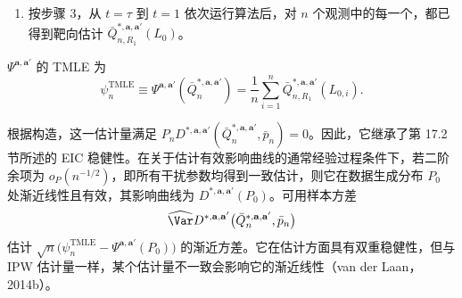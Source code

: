 \begin{enumerate}[label=\arabic*.]
\begin{enumerate}[label=(\alph*),leftmargin=2.4em]
\[  \]
  对 $\mathbf A_t,\mathbf R_t,\mathbf Z_{t-1},\mathbf L_{t-1}$ 回归。然后，对这些未删失观测，在其观测到的中介与协变量历史 $\mathbf R_t,\mathbf Z_{t-1},\mathbf L_{t-1}$，以及干预后的收入水平 $\mathbf A_t=\mathbf a'_t$ 处，对拟合函数求值。由此得到初始估计 $\bar Q_{n,Z_t}^{\mathbf a,\mathbf a'}(\mathbf R_t,\mathbf L_{t-1},\mathbf Z_{t-1})$。用 $\bar Q_{n,Z_t}^{*,\mathbf a,\mathbf a'}\equiv\bar Q_{n,Z_t}^{\mathbf a,\mathbf a'}(\epsilon_{n,Z_t})$ 更新该估计，其中
  \[
   \epsilon_{n,Z_t}\equiv\argmin_\epsilon
   P_nH_{Z_t}^{\mathbf a,\mathbf a'}(\bar p_n)
   L\bigl(\bar Q_{n,Z_t}^{\mathbf a,\mathbf a'}(\epsilon)\bigr).
  \]
  \item 最后，为获得初始估计量 $\bar Q_{n,R_t}^{\mathbf a,\mathbf a'}$，在时点 $t$ 仍未删失的观测中，将上面构造的靶向估计
  \[
   \bar Q_{n,Z_t}^{*,\mathbf a,\mathbf a'}(\mathbf R_t,\mathbf Z_{t-1},\mathbf L_{t-1})
  \]
  对 $\mathbf A_t,\mathbf R_{t-1},\mathbf Z_{t-1},\mathbf L_{t-1}$ 回归。然后，对这些未删失观测，在其观测到的中介与协变量历史 $\mathbf R_{t-1},\mathbf Z_{t-1},\mathbf L_{t-1}$，以及干预后的收入水平 $\mathbf A_t=\mathbf a_t$ 处，对拟合函数求值。由此得到初始估计 $\bar Q_{n,R_t}^{\mathbf a,\mathbf a'}(\mathbf R_{t-1},\mathbf L_{t-1},\mathbf Z_{t-1})$。用 $\bar Q_{n,R_t}^{*,\mathbf a,\mathbf a'}\equiv\bar Q_{n,R_t}^{\mathbf a,\mathbf a'}(\epsilon_{n,R_t})$ 更新该估计，其中
  \[
   \epsilon_{n,R_t}\equiv\argmin_\epsilon
   P_nH_{R_t}^{\mathbf a,\mathbf a'}(\bar p_n)
   L\bigl(\bar Q_{n,R_t}^{\mathbf a,\mathbf a'}(\epsilon)\bigr).
  \]
 \end{enumerate}
 \item 按步骤 3，从 $t=\tau$ 到 $t=1$ 依次运行算法后，对 $n$ 个观测中的每一个，都已得到靶向估计 $\bar Q_{n,R_1}^{*,\mathbf a,\mathbf a'}(L_0)$。
\end{enumerate}
$\Psi^{\mathbf a,\mathbf a'}$ 的 TMLE 为
\begin{equation}
 \psi_n^{\mathrm{TMLE}}\equiv\Psi^{\mathbf a,\mathbf a'}(\bar Q_n^{*,\mathbf a,\mathbf a'})
 =\frac1n\sum_{i=1}^n\bar Q_{n,R_1}^{*,\mathbf a,\mathbf a'}(L_{0,i}).
 \tag{17.20}
\end{equation}

根据构造，这一估计量满足 $P_nD^{*,\mathbf a,\mathbf a'}(\bar Q_n^{*,\mathbf a,\mathbf a'},\bar p_n)=0$。因此，它继承了第 17.2 节所述的 EIC 稳健性。在关于估计有效影响曲线的通常经验过程条件下，若二阶余项为 $o_P(n^{-1/2})$，即所有干扰参数均得到一致估计，则它在数据生成分布 $P_0$ 处渐近线性且有效，其影响曲线为 $D^{*,\mathbf a,\mathbf a'}(P_0)$。可用样本方差
\[
 \widehat{\Var}D^{*,\mathbf a,\mathbf a'}\bigl(\bar Q_n^{*,\mathbf a,\mathbf a'},\bar p_n\bigr)
\]
估计 $\sqrt n\bigl(\psi_n^{\mathrm{TMLE}}-\Psi^{\mathbf a,\mathbf a'}(P_0)\bigr)$ 的渐近方差。它在估计方面具有双重稳健性，但与 IPW 估计量一样，某个估计量不一致会影响它的渐近线性（van der Laan，2014b）。
